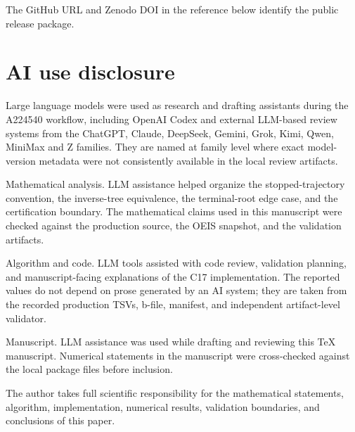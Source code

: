 \documentclass[11pt]{article}
\theoremstyle{definition}
\theoremstyle{remark}
\begin{document}
The GitHub URL and Zenodo DOI in the reference below identify the public
release package.

\section*{AI use disclosure}

Large language models were used as research and drafting assistants during the
A224540 workflow, including OpenAI Codex and external LLM-based review systems
from the ChatGPT, Claude, DeepSeek, Gemini, Grok, Kimi, Qwen, MiniMax and Z
families.  They are named at family level where exact model-version metadata
were not consistently available in the local review artifacts.

Mathematical analysis.  LLM assistance helped organize the stopped-trajectory
convention, the inverse-tree equivalence, the terminal-root edge case, and the
certification boundary.  The mathematical claims used in this manuscript were
checked against the production source, the OEIS snapshot, and the validation
artifacts.

Algorithm and code.  LLM tools assisted with code review, validation planning,
and manuscript-facing explanations of the C17 implementation.  The reported
values do not depend on prose generated by an AI system; they are taken from
the recorded production TSVs, b-file, manifest, and independent artifact-level
validator.

Manuscript.  LLM assistance was used while drafting and reviewing this TeX
manuscript.  Numerical statements in the manuscript were cross-checked against
the local package files before inclusion.

The author takes full scientific responsibility for the mathematical
statements, algorithm, implementation, numerical results, validation
boundaries, and conclusions of this paper.
\end{document}
